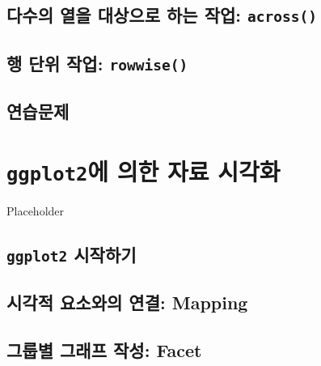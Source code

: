 \documentclass[
]{book}
\begin{document}
\hypertarget{uxb2e4uxc218uxc758-uxc5f4uxc744-uxb300uxc0c1uxc73cuxb85c-uxd558uxb294-uxc791uxc5c5-across}{%
\section{\texorpdfstring{다수의 열을 대상으로 하는 작업: \texttt{across()}}{다수의 열을 대상으로 하는 작업: across()}}\label{uxb2e4uxc218uxc758-uxc5f4uxc744-uxb300uxc0c1uxc73cuxb85c-uxd558uxb294-uxc791uxc5c5-across}}

\hypertarget{uxd589-uxb2e8uxc704-uxc791uxc5c5-rowwise}{%
\section{\texorpdfstring{행 단위 작업: \texttt{rowwise()}}{행 단위 작업: rowwise()}}\label{uxd589-uxb2e8uxc704-uxc791uxc5c5-rowwise}}

\hypertarget{uxc5f0uxc2b5uxbb38uxc81c-2}{%
\section{연습문제}\label{uxc5f0uxc2b5uxbb38uxc81c-2}}

\hypertarget{chapter-ggplot2}{%
\chapter{\texorpdfstring{\texttt{ggplot2}에 의한 자료 시각화}{ggplot2에 의한 자료 시각화}}\label{chapter-ggplot2}}

Placeholder

\hypertarget{ggplot2-uxc2dcuxc791uxd558uxae30}{%
\section{\texorpdfstring{\texttt{ggplot2} 시작하기}{ggplot2 시작하기}}\label{ggplot2-uxc2dcuxc791uxd558uxae30}}

\hypertarget{uxc2dcuxac01uxc801-uxc694uxc18cuxc640uxc758-uxc5f0uxacb0-mapping}{%
\section{시각적 요소와의 연결: Mapping}\label{uxc2dcuxac01uxc801-uxc694uxc18cuxc640uxc758-uxc5f0uxacb0-mapping}}

\hypertarget{uxadf8uxb8f9uxbcc4-uxadf8uxb798uxd504-uxc791uxc131-facet}{%
\section{그룹별 그래프 작성: Facet}\label{uxadf8uxb8f9uxbcc4-uxadf8uxb798uxd504-uxc791uxc131-facet}}
\end{document}
